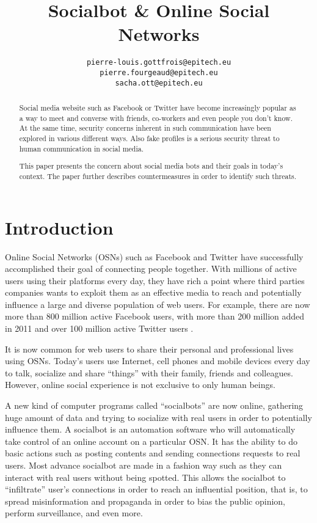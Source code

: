\documentclass[12pt,a4paper]{article}
\title{Socialbot \& Online Social Networks}
\author{
  \texttt{pierre-louis.gottfrois@epitech.eu} \\
  \texttt{pierre.fourgeaud@epitech.eu} \\
  \texttt{sacha.ott@epitech.eu}
}
\begin{document}
\ifpdf
{}
\else
{}
\fi

\maketitle

\begin{abstract}
  Social media website such as Facebook or Twitter have become increasingly popular as
  a way to meet and converse with friends, co-workers and even people you don't know.
  At the same time, security concerns inherent in such communication have been explored
  in various different ways. Also fake profiles is a serious security threat to human
  communication in social media.

  This paper presents the concern about social media bots and their goals in today's context.
  The paper further describes countermeasures in order to identify such threats.
\end{abstract}

\section{Introduction}
Online Social Networks (OSNs) such as Facebook and Twitter have successfully accomplished
their goal of connecting people together. With millions of active users using their
platforms every day, they have rich a point where third parties companies wants to exploit
them as an effective media to reach and potentially influence a large and diverse
population of web users. For example, there are now more than 800 million active Facebook
users, with more than 200 million added in 2011 and over 100 million active Twitter
users \cite{stats_of_the_day}.

It is now common for web users to share their personal and professional lives using OSNs.
Today’s users use Internet, cell phones and mobile devices every day to talk, socialize
and share “things” with their family, friends and colleagues. However, online social
experience is not exclusive to only human beings.

A new kind of computer programs called “socialbots” are now online, gathering huge amount
of data and trying to socialize with real users in order to potentially influence them.
A socialbot is an automation software who will automatically take control of an online
account on a particular OSN. It has the ability to do basic actions such as posting
contents and sending connections requests to real users. Most advance socialbot are made
in a fashion way such as they can interact with real users without being spotted.
This allows the socialbot to “infiltrate” user’s connections in order to reach an
influential position, that is, to spread misinformation and propaganda in order to bias
the public opinion, perform surveillance, and even more.
\end{document}
